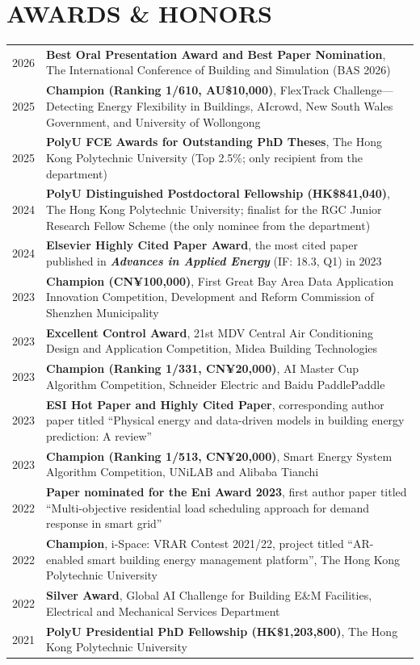 \documentclass[11pt,a4paper]{article}
\newcounter{cvbookmark}
\newcommand{\cvoutline}[2]{%
  \stepcounter{cvbookmark}%
  \pdfbookmark[#1]{#2}{cvbookmark.\thecvbookmark}%
}
\newcommand{\cvsection}[2]{%
  \cvoutline{1}{#1}%
  \section*{#2}%
}
\newlength{\cvitemgap}
\newcommand{\cvtabrowgap}{\\\noalign{\vskip\cvitemgap}}
\begin{document}
\cvsection{AWARDS \& HONORS}{AWARDS \& HONORS}
\begin{longtable}{@{}p{1cm}@{\hspace{0.20cm}}>{\justifying\arraybackslash}p{\dimexpr\textwidth-1.20cm\relax}@{}}
2026 & \textbf{Best Oral Presentation Award and Best Paper Nomination}, The International Conference of Building and Simulation (BAS 2026) \cvtabrowgap
2025 & \textbf{Champion (Ranking 1/610, AU\$10,000)}, FlexTrack Challenge---Detecting Energy Flexibility in Buildings, AIcrowd, New South Wales Government, and University of Wollongong \cvtabrowgap
2025 & \textbf{PolyU FCE Awards for Outstanding PhD Theses}, The Hong Kong Polytechnic University (Top 2.5\%; only recipient from the department) \cvtabrowgap
2024 & \textbf{PolyU Distinguished Postdoctoral Fellowship (HK\$841{,}040)}, The Hong Kong Polytechnic University; finalist for the RGC Junior Research Fellow Scheme (the only nominee from the department) \cvtabrowgap
2024 & \textbf{Elsevier Highly Cited Paper Award}, the most cited paper published in \textbf{\textit{Advances in Applied Energy}} (IF: 18.3, Q1) in 2023 \cvtabrowgap
2023 & \textbf{Champion (CN¥100,000)}, First Great Bay Area Data Application Innovation Competition, Development and Reform Commission of Shenzhen Municipality \cvtabrowgap
2023 & \textbf{Excellent Control Award}, 21st MDV Central Air Conditioning Design and Application Competition, Midea Building Technologies \cvtabrowgap
2023 & \textbf{Champion (Ranking 1/331, CN¥20,000)}, AI Master Cup Algorithm Competition, Schneider Electric and Baidu PaddlePaddle \cvtabrowgap
2023 & \textbf{ESI Hot Paper and Highly Cited Paper}, corresponding author paper titled ``Physical energy and data-driven models in building energy prediction: A review'' \cvtabrowgap
2023 & \textbf{Champion (Ranking 1/513, CN¥20,000)}, Smart Energy System Algorithm Competition, UNiLAB and Alibaba Tianchi \cvtabrowgap
2022 & \textbf{Paper nominated for the Eni Award 2023}, first author paper titled ``Multi-objective residential load scheduling approach for demand response in smart grid'' \cvtabrowgap
2022 & \textbf{Champion}, i-Space: VRAR Contest 2021/22, project titled ``AR-enabled smart building energy management platform'', The Hong Kong Polytechnic University \cvtabrowgap
2022 & \textbf{Silver Award}, Global AI Challenge for Building E\&M Facilities, Electrical and Mechanical Services Department \cvtabrowgap
2021 & \textbf{PolyU Presidential PhD Fellowship (HK\$1{,}203{,}800)}, The Hong Kong Polytechnic University \\
\end{longtable}
\end{document}

